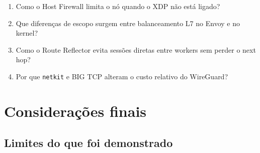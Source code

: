 \documentclass[12pt,openany,oneside,a4paper,chapter=TITLE,english,brazil]{abntex2}
\providecommand{\tightlist}{\setlength{\itemsep}{0pt}\setlength{\parskip}{0pt}}
\begin{document}
\begin{enumerate}
\def\labelenumi{\arabic{enumi}.}
\tightlist
\item
  Como o Host Firewall limita o nó quando o XDP não está ligado?
\item
  Que diferenças de escopo surgem entre balanceamento L7 no Envoy e no kernel?
\item
  Como o Route Reflector evita sessões diretas entre workers sem perder o next hop?
\item
  Por que \texttt{netkit} e BIG TCP alteram o custo relativo do WireGuard?
\end{enumerate}

\chapter*{Considerações finais}

\section*{Limites do que foi demonstrado}\label{limites-do-que-foi-demonstrado}
\end{document}
